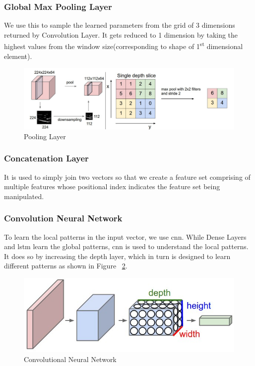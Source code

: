 \subsubsection{Global Max Pooling Layer}
We use this to sample the learned parameters from the grid of 3 dimensions returned by Convolution Layer. It gets reduced to 1 dimension by taking the highest values from the window size(corresponding to shape of 1\textsuperscript{st} dimensional element).
\begin{figure}
  [ht]\centering
  \includegraphics[width=.75\linewidth]{mainmatter/3-Methodology/images/pooling.png}
  \caption{Pooling Layer}
  \label{fig:pool_layer}
\end{figure}

\subsubsection{Concatenation Layer}
It is used to simply join two vectors so that we create a feature set comprising of multiple features whose positional index indicates the feature set being manipulated.

\subsubsection{Convolution Neural Network}
To learn the local patterns in the input vector, we use \acrshort{cnn}. While Dense Layers and \acrshort{lstm} learn the global patterns, \acrshort{cnn} is used to understand the local patterns. It does so by increasing the depth layer, which in turn is designed to learn different patterns as shown in Figure ~\ref{fig:cnn}.
\begin{figure}[ht]
  \centering
  \includegraphics[width=.5\linewidth]{mainmatter/3-Methodology/images/cnn.jpg}
  \caption{Convolutional Neural Network}
  \label{fig:cnn}
\end{figure}

